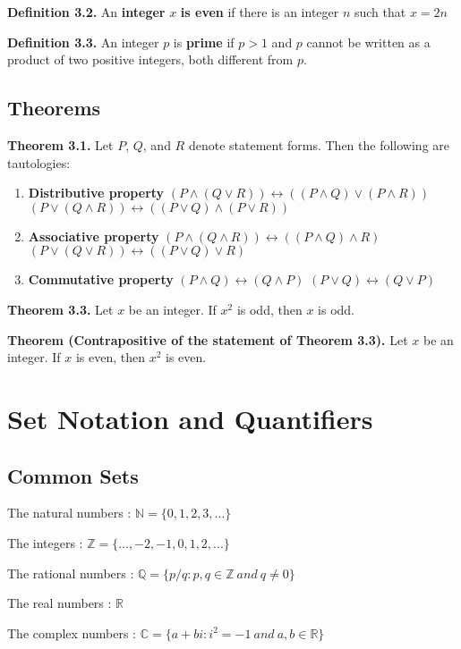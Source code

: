\documentclass{article}
\begin{document}
\textbf{Definition 3.2.} An \textbf{integer} $x$ \textbf{is even} if there is an integer $n$ such that $x = 2n$

\textbf{Definition 3.3.} An integer $p$ is \textbf{prime} if $p > 1$ and $p$ cannot be written as a product of two positive integers, both different from $p$.


\subsection{Theorems}
\textbf{Theorem 3.1.} Let $P$, $Q$, and $R$ denote statement forms. Then the following are tautologies:
\begin{enumerate}
	\item \textbf{Distributive property}
		\subitem  $(P \land (Q \lor R)) \leftrightarrow ((P \land Q) \lor (P \land R))$
		\subitem  $(P \lor (Q \land R)) \leftrightarrow ((P \lor Q) \land (P \lor R))$
	\item \textbf{Associative property}
		\subitem $(P \land (Q \land R)) \leftrightarrow ((P \land Q) \land R)$
		\subitem $(P \lor (Q \lor R)) \leftrightarrow ((P \lor Q) \lor R)$

	\item \textbf{Commutative property}
		\subitem  $(P \land Q) \leftrightarrow (Q \land P)$
		\subitem  $(P \lor Q) \leftrightarrow (Q \lor P)$
\end{enumerate} 

\textbf{Theorem 3.3.} Let $x$ be an integer. If $x^2$ is odd, then $x$ is odd.

\textbf{Theorem (Contrapositive of the statement of Theorem 3.3).} Let $x$ be an integer. If $x$ is even, then $x^2$ is even.


\section{Set Notation and Quantifiers}
\subsection{Common Sets}
The natural numbers : $\mathbb{N} = \{0,1,2,3,...\}$

The integers : $\mathbb{Z} = \{...,-2,-1,0,1,2,...\}$

The rational numbers : $\mathbb{Q} = \{p/q : p,q \in \mathbb{Z}\ and\ q \neq 0 \}$

The real numbers : $\mathbb{R}$

The complex numbers : $\mathbb{C} = \{a + bi : i^2 = -1 \ and \ a,b \in \mathbb{R}\}$
\end{document}
